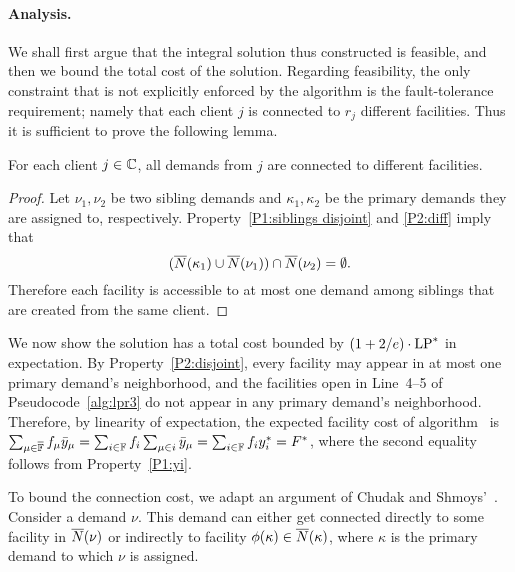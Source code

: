 \documentclass[11pt]{article}
\begin{document}

\paragraph{Analysis.}
We shall first argue that the integral solution thus
constructed is feasible, and then we bound the total cost of
the solution. Regarding feasibility, the only constraint that is
not explicitly enforced by the algorithm is the fault-tolerance
requirement; namely that each client $j$ is connected to $r_j$
different facilities. Thus it is sufficient to prove the following lemma.


\begin{lemma}\label{lem: lpr3 feasible}
For each client $j\in\mathbb{C}$, all demands from $j$ are connected to
different facilities.
\end{lemma}


\begin{proof}
  Let $\nu_1,\nu_2$ be two sibling demands and
  $\kappa_1,\kappa_2$ be the primary demands they are assigned to, respectively. 
  Property~\ref{P1:siblings disjoint} and \ref{P2:diff} imply that
%
  \begin{equation*}
    ({\overline{N}}(\kappa_1) \cup {\overline{N}}(\nu_1)) \cap {\overline{N}}(\nu_2) = \emptyset.
  \end{equation*}
%
  Therefore each facility is accessible to at most one
  demand among siblings that are created from the same
  client.
\end{proof}


\medskip

We now show the solution has a total cost bounded by
$(1+2/e) \cdot \mbox{\rm LP}^\ast$ in expectation. By
Property~\ref{P2:disjoint}, every facility may appear in at
most one primary demand's neighborhood, and the facilities
open in Line~4--5 of Pseudocode~\ref{alg:lpr3} do not appear
in any primary demand's neighborhood. Therefore, by
linearity of expectation, the expected facility cost of
algorithm~{\ECHU} is $\sum_{\mu\in\overline{\mathbb{F}}}
f_\mu {\bar y}_{\mu} = \sum_{i\in\mathbb{F}} f_i\sum_{\mu\in i}
{\bar y}_{\mu} = \sum_{i\in\mathbb{F}} f_i y_i^\ast = F^\ast$,
where the second equality follows from Property~\ref{P1:yi}.

To bound the connection cost, we adapt an argument of Chudak
and Shmoys'~\cite{ChudakS04}. Consider a demand $\nu$. This demand can either
get connected directly to some facility in ${\overline{N}}(\nu)$ or indirectly to
facility $\phi(\kappa)\in {\overline{N}}(\kappa)$, where $\kappa$ is the primary
demand to which $\nu$ is assigned. 
\end{document}
